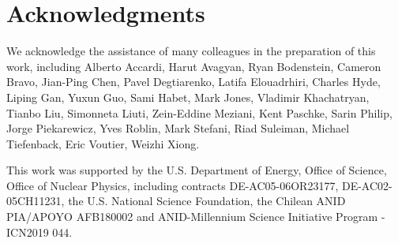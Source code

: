\section*{Acknowledgments}
We acknowledge the assistance of many colleagues in the preparation of this work, including
Alberto Accardi,
Harut Avagyan,
Ryan Bodenstein,
Cameron Bravo,
Jian-Ping Chen,
Pavel Degtiarenko,
Latifa Elouadrhiri, 
Charles Hyde, 
Liping Gan,
Yuxun Guo, 
Sami Habet,
Mark Jones, 
Vladimir Khachatryan,
Tianbo Liu,
Simonneta Liuti, 
Zein-Eddine Meziani, 
Kent Paschke,
Sarin Philip,
Jorge Piekarewicz,
Yves Roblin,
Mark Stefani,
Riad Suleiman,
Michael Tiefenback,
Eric Voutier,
Weizhi Xiong.

This work was supported by the U.S. Department of Energy, Office of Science, Office of Nuclear Physics, including contracts DE-AC05-06OR23177, DE-AC02-05CH11231, the U.S. National Science Foundation, the Chilean ANID PIA/APOYO AFB180002 and ANID-Millennium Science Initiative Program - ICN2019 044. 